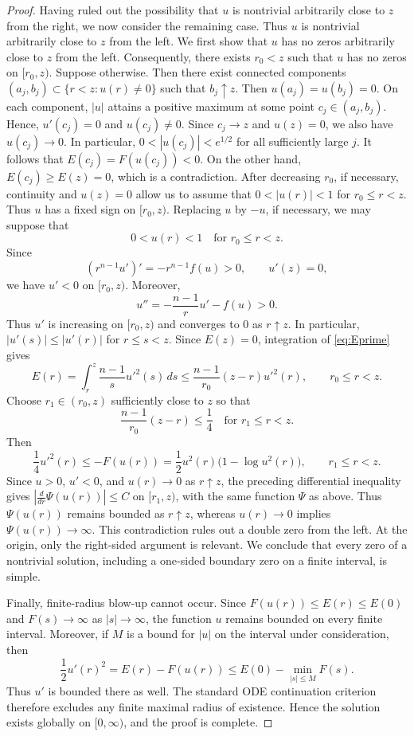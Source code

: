 \documentclass[11pt]{article}
\begin{document}
\begin{proof}
Having ruled out the possibility that $u$ is nontrivial arbitrarily close to $z$ from the right, we now consider the remaining case. Thus $u$ is nontrivial arbitrarily close to $z$ from the left. We first show that $u$ has no zeros arbitrarily close to $z$ from the left. Consequently, there exists $r_0<z$ such that $u$ has no zeros on
$[r_0,z)$. Suppose otherwise. Then there exist connected components $(a_j,b_j)\subset\{r<z:u(r)\ne0\}$ such that $b_j\uparrow z$. Then $u(a_j)=u(b_j)=0$.
On each component, $|u|$ attains a positive maximum at some point $c_j\in(a_j,b_j)$. Hence, $u'(c_j)=0$ and   $u(c_j)\ne0$.
Since $c_j\to z$ and $u(z)=0$, we also have $u(c_j)\to0$. In particular, $0<|u(c_j)|<e^{1/2}$ for all sufficiently large $j$. It follows that $E(c_j)=F(u(c_j))<0$. On the other hand,  $E(c_j)\ge E(z)=0$, which is a contradiction.  After decreasing $r_0$, if necessary, continuity and $u(z)=0$ allow us to assume that
$0<|u(r)|<1$ for $r_0\leq r<z$.
Thus $u$ has a fixed sign on $[r_0,z)$. Replacing $u$ by $-u$, if necessary, we may suppose that
\begin{equation*}
  0<u(r)<1
\quad\text{for }r_0\le r<z.
\end{equation*}
Since
\[
 (r^{n-1}u')'=-r^{n-1}f(u)>0,
 \qquad u'(z)=0,
\]
we have $u'<0$ on $[r_0,z)$.  Moreover,
\[
 u''=-\frac{n-1}{r}u'-f(u)>0.
\]
Thus $u'$ is increasing on $[r_0,z)$ and converges to $0$ as
$r\uparrow z$. In particular,
$|u'(s)|\le |u'(r)|$ for $r\le s<z$.  Since $E(z)=0$, integration of \eqref{eq:Eprime} gives
\[
 E(r)=\int_r^z\frac{n-1}{s}u'^2(s)\,ds
 \le \frac{n-1}{r_0}(z-r)u'^2(r),\qquad r_0\leq r<z.
\]
Choose $r_1\in(r_0,z)$ sufficiently close to $z$ so that
\[
\frac{n-1}{r_0}(z-r)\le\frac14
\quad\text{for }r_1\le r<z.
\]
Then
\[
 \frac14u'^2(r)\le -F(u(r))
 =\frac12u^2(r)\bigl(1-\log u^2(r)\bigr),\qquad r_1\le r<z.
\]
{Since $u>0$, $u'<0$, and $u(r)\to0$ as $r\uparrow z$, the
preceding differential inequality gives
$\left|\frac{d}{dr}\Psi(u(r))\right|\le C$ on $[r_1,z)$, with the
same function $\Psi$ as above. Thus $\Psi(u(r))$ remains bounded as
$r\uparrow z$, whereas $u(r)\to0$ implies
$\Psi(u(r))\to\infty$. This contradiction rules out a double zero
from the left.}
At the origin, only the right-sided argument is relevant. We conclude that every zero of a nontrivial solution, including a one-sided boundary zero on a finite interval, is simple.

Finally, finite-radius blow-up cannot occur. Since $F(u(r))\leq E(r)\leq E(0)$ and $F(s)\to\infty$ as $|s|\to\infty$, the function $u$ remains bounded on every {finite interval}. Moreover, if $M$ is a bound for $|u|$ on the interval under
consideration, then
\[
 \frac12u'(r)^2=E(r)-F(u(r))
 \le E(0)-\min_{|s|\le M}F(s).
\]
Thus $u'$ is bounded there as well. The standard ODE continuation criterion therefore excludes any finite maximal radius of existence. Hence the solution exists globally on $[0,\infty)$, and the proof is complete.
\end{proof}
\end{document}
